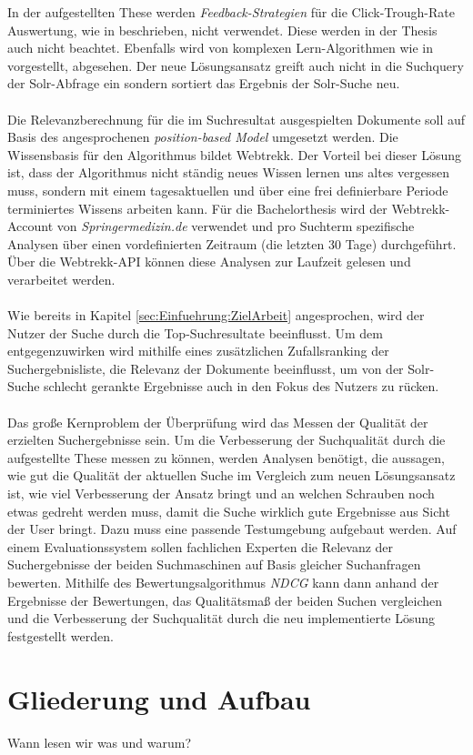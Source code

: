 In der aufgestellten These werden \textit{Feedback-Strategien} für die Click-Trough-Rate Auswertung, wie in \cite{Joachims} beschrieben, nicht verwendet. Diese werden in der Thesis auch nicht beachtet. Ebenfalls wird von komplexen Lern-Algorithmen wie in \cite{IWUSBI} vorgestellt, abgesehen. Der neue Lösungsansatz greift auch nicht in die Suchquery der Solr-Abfrage ein sondern sortiert das Ergebnis der Solr-Suche neu.
\\
\\
Die Relevanzberechnung für die im Suchresultat ausgespielten Dokumente soll auf Basis des angesprochenen \textit{position-based Model} \cite{chuklin2015} umgesetzt werden. Die Wissensbasis für den Algorithmus bildet Webtrekk. Der Vorteil bei dieser Lösung ist, dass der Algorithmus nicht ständig neues Wissen lernen uns altes vergessen muss, sondern mit einem tagesaktuellen und über eine frei definierbare Periode terminiertes Wissens  arbeiten kann. Für die Bachelorthesis wird der Webtrekk-Account von \textit{Springermedizin.de} verwendet und pro Suchterm spezifische Analysen über einen vordefinierten Zeitraum (die letzten 30 Tage) durchgeführt. Über die Webtrekk-API können diese Analysen zur Laufzeit gelesen und verarbeitet werden. 
\\
\\
Wie bereits in Kapitel \ref{sec:Einfuehrung:ZielArbeit} angesprochen, wird der Nutzer der Suche durch die Top-Suchresultate beeinflusst. Um dem entgegenzuwirken wird mithilfe eines zusätzlichen Zufallsranking der Suchergebnisliste, die Relevanz der Dokumente beeinflusst, um von der Solr-Suche schlecht gerankte Ergebnisse auch in den Fokus des Nutzers zu rücken.
\\
\\
Das große Kernproblem der Überprüfung wird das Messen der Qualität der erzielten Suchergebnisse sein. Um die Verbesserung der Suchqualität durch die aufgestellte These messen zu können, werden Analysen benötigt, die aussagen, wie gut die Qualität der aktuellen Suche im Vergleich zum neuen Lösungsansatz ist, wie viel Verbesserung der Ansatz bringt und an welchen Schrauben noch etwas gedreht werden muss, damit die Suche wirklich gute Ergebnisse aus Sicht der User bringt. Dazu muss eine passende Testumgebung aufgebaut werden. Auf einem Evaluationssystem sollen fachlichen Experten die Relevanz der Suchergebnisse der beiden Suchmaschinen auf Basis gleicher Suchanfragen bewerten. Mithilfe des Bewertungsalgorithmus \textit{NDCG} kann dann anhand der Ergebnisse der Bewertungen, das Qualitätsmaß der beiden Suchen vergleichen und die Verbesserung der Suchqualität durch die neu implementierte Lösung festgestellt werden.

\section{Gliederung und Aufbau}
\label{sec:Einfuehrung:GliederungAufbau}

Wann lesen wir was und warum?